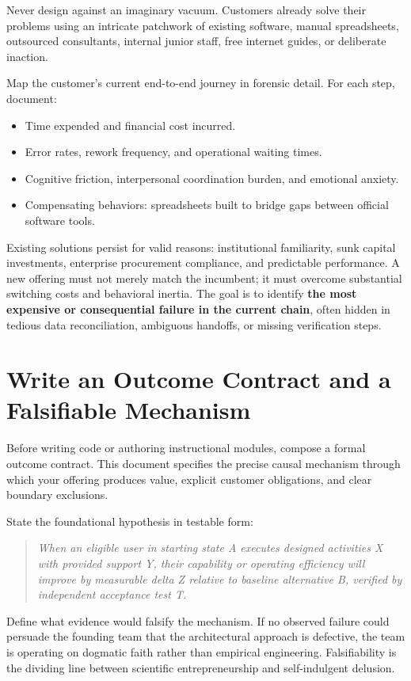 Never design against an imaginary vacuum. Customers already solve their problems using an intricate patchwork of existing software, manual spreadsheets, outsourced consultants, internal junior staff, free internet guides, or deliberate inaction.

Map the customer's current end-to-end journey in forensic detail. For each step, document:
\begin{itemize}[leftmargin=*]
\item Time expended and financial cost incurred.
\item Error rates, rework frequency, and operational waiting times.
\item Cognitive friction, interpersonal coordination burden, and emotional anxiety.
\item Compensating behaviors: spreadsheets built to bridge gaps between official software tools.
\end{itemize}

Existing solutions persist for valid reasons: institutional familiarity, sunk capital investments, enterprise procurement compliance, and predictable performance. A new offering must not merely match the incumbent; it must overcome substantial switching costs and behavioral inertia. The goal is to identify \textbf{the most expensive or consequential failure in the current chain}, often hidden in tedious data reconciliation, ambiguous handoffs, or missing verification steps.

\section{Write an Outcome Contract and a Falsifiable Mechanism}

Before writing code or authoring instructional modules, compose a formal outcome contract. This document specifies the precise causal mechanism through which your offering produces value, explicit customer obligations, and clear boundary exclusions.

State the foundational hypothesis in testable form:
\begin{quote}
\itshape
When an eligible user in starting state A executes designed activities X with provided support Y, their capability or operating efficiency will improve by measurable delta Z relative to baseline alternative B, verified by independent acceptance test T.
\end{quote}

Define what evidence would falsify the mechanism. If no observed failure could persuade the founding team that the architectural approach is defective, the team is operating on dogmatic faith rather than empirical engineering. Falsifiability is the dividing line between scientific entrepreneurship and self-indulgent delusion.

